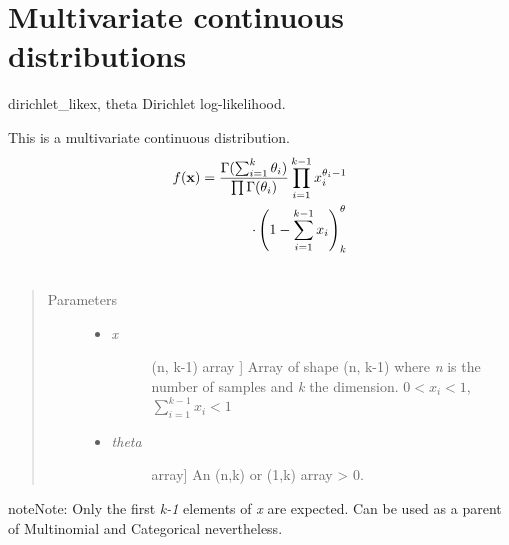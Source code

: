 \section{Multivariate continuous distributions}

\hypertarget{pymc.distributions.dirichlet_like}{}\begin{funcdesc}{dirichlet\_like}{x, theta}
Dirichlet log-likelihood.

This is a multivariate continuous distribution.
\begin{gather}
\begin{split}f(\mathbf{x}) = \frac{\Gamma(\sum_{i=1}^k \theta_i)}{\prod \Gamma(\theta_i)}\prod_{i=1}^{k-1} x_i^{\theta_i - 1}\\
\cdot\left(1-\sum_{i=1}^{k-1}x_i\right)^\theta_k\end{split}\notag\\\begin{split}\end{split}\notag
\end{gather}\begin{quote}\begin{description}
\item[Parameters] \leavevmode\begin{itemize}
\item {} \begin{description}
\item[\emph{x}] \leavevmode{[}(n, k-1) array {]}
Array of shape (n, k-1) where \emph{n} is the number of samples 
and \emph{k} the dimension. 
$0 < x_i < 1$,  $\sum_{i=1}^{k-1} x_i < 1$

\end{description}

\item {} \begin{description}
\item[\emph{theta}] \leavevmode{[}array{]}
An (n,k) or (1,k) array \textgreater{} 0.

\end{description}

\end{itemize}

\end{description}\end{quote}

\begin{notice}{note}{Note:}
Only the first \emph{k-1} elements of \emph{x} are expected. Can be used as a parent of Multinomial and Categorical
nevertheless.
\end{notice}
\end{funcdesc}


